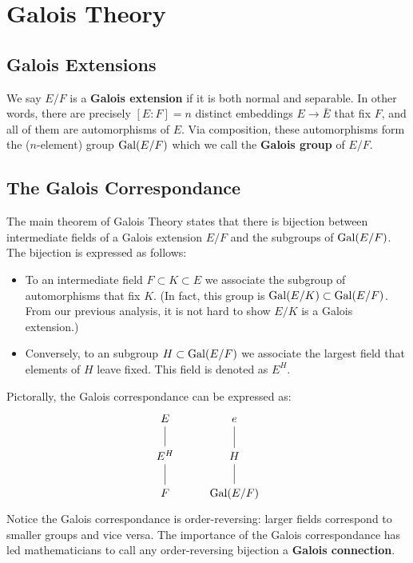 \section{Galois Theory}

\subsection{Galois Extensions}

We say $E/F$ is a \textbf{Galois extension} if it is both normal and separable. In other words, there are precisely $[E : F] = n$ distinct embeddings $E \to \bar{E}$ that fix $F$, and all of them are automorphisms of $E$. Via composition, these automorphisms form the ($n$-element) group $\operatorname{Gal}(E/F)$ which we call the \textbf{Galois group} of $E/F$.

\subsection{The Galois Correspondance}

The main theorem of Galois Theory states that there is bijection between intermediate fields of a Galois extension $E/F$ and the subgroups of $\operatorname{Gal}(E/F)$. The bijection is expressed as follows:
\begin{itemize}
    \item To an intermediate field $F \subset K \subset E$ we associate the subgroup of automorphisms that fix $K$. (In fact, this group is $\operatorname{Gal}(E/K) \subset \operatorname{Gal}(E/F)$. From our previous analysis, it is not hard to show $E/K$ is a Galois extension.)
    \item Conversely, to an subgroup $H \subset \operatorname{Gal}(E/F)$ we associate the largest field that elements of $H$ leave fixed. This field is denoted as $E^H$.
\end{itemize}

Pictorally, the Galois correspondance can be expressed as:
\[
    \begin{tikzcd}
        E \arrow[d, no head]   & e \arrow[d, no head] \\
        E^H \arrow[d, no head] & H \arrow[d, no head] \\
        F                      & \Gal(E/F)           
    \end{tikzcd}
\]
Notice the Galois correspondance is order-reversing: larger fields correspond to smaller groups and vice versa. The importance of the Galois correspondance has led mathematicians to call any order-reversing bijection a \textbf{Galois connection}.